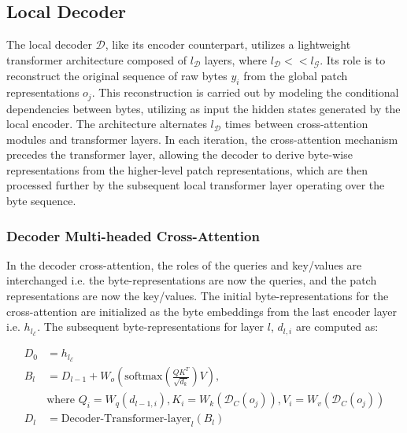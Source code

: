 \subsection{Local Decoder} 

The local decoder $\mathcal{D}$, like its encoder counterpart, utilizes a lightweight transformer architecture composed of $l_{\mathcal{D}}$ layers, where $l_{\mathcal{D}} << l_{\mathcal{G}}$. Its role is to reconstruct the original sequence of raw bytes $y_i$ from the global patch representations $o_j$. This reconstruction is carried out by modeling the conditional dependencies between bytes, utilizing as input the hidden states generated by the local encoder. The architecture alternates $l_{\mathcal{D}}$ times between cross-attention modules and transformer layers. In each iteration, the cross-attention mechanism precedes the transformer layer, allowing the decoder to derive byte-wise representations from the higher-level patch representations, which are then processed further by the subsequent local transformer layer operating over the byte sequence.

\subsubsection{Decoder Multi-headed Cross-Attention} 

In the decoder cross-attention, the roles of the queries and key/values are interchanged i.e. the byte-representations are now the queries, and the patch representations are now the key/values. The initial byte-representations for the cross-attention are initialized as the byte embeddings from the last encoder layer i.e. $h_{l_{\mathcal{E}}}$. The subsequent byte-representations for layer $l$, $d_{l,i}$ are computed as:

\begin{align}
D_0 &= h_{l_{\mathcal{E}}} \\
B_l &= D_{l-1} + W_o\left(\text{softmax}\left(\frac{QK^T}{\sqrt{d_k}}\right)V\right), \\
  &\text{where } Q_i = W_q(d_{l-1,i}), K_i = W_k(\mathcal{D}_C(o_j)), V_i = W_v(\mathcal{D}_C(o_j)) \\
  D_l &= \text{Decoder-Transformer-layer}_l(B_l)
\end{align}


